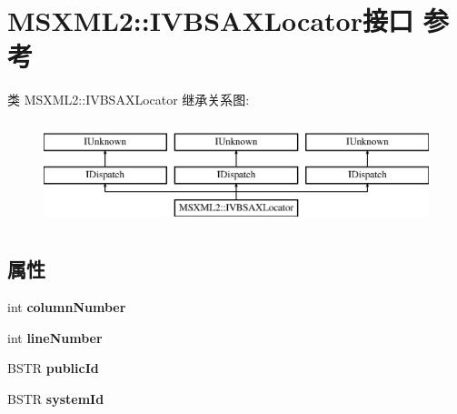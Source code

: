 \hypertarget{interface_m_s_x_m_l2_1_1_i_v_b_s_a_x_locator}{}\section{M\+S\+X\+M\+L2\+:\+:I\+V\+B\+S\+A\+X\+Locator接口 参考}
\label{interface_m_s_x_m_l2_1_1_i_v_b_s_a_x_locator}
类 M\+S\+X\+M\+L2\+:\+:I\+V\+B\+S\+A\+X\+Locator 继承关系图\+:\begin{figure}[H]
\begin{center}
\leavevmode
\includegraphics[height=3.000000cm]{interface_m_s_x_m_l2_1_1_i_v_b_s_a_x_locator}
\end{center}
\end{figure}
\subsection*{属性}
\begin{DoxyCompactItemize}
\item 
\mbox{\label{interface_m_s_x_m_l2_1_1_i_v_b_s_a_x_locator_ac156ff5ef54b1f1b9e859f9e79682a68}} 
int {\bfseries column\+Number}
\item 
\mbox{\label{interface_m_s_x_m_l2_1_1_i_v_b_s_a_x_locator_a63396f76eef3407b9ebffb9467335fc4}} 
int {\bfseries line\+Number}
\item 
\mbox{\label{interface_m_s_x_m_l2_1_1_i_v_b_s_a_x_locator_a6465ab457a2813c528c34769ac1d162d}} 
B\+S\+TR {\bfseries public\+Id}
\item 
\mbox{\label{interface_m_s_x_m_l2_1_1_i_v_b_s_a_x_locator_aaa4f9134852678cca0062287b58e0114}} 
B\+S\+TR {\bfseries system\+Id}
\end{DoxyCompactItemize}
